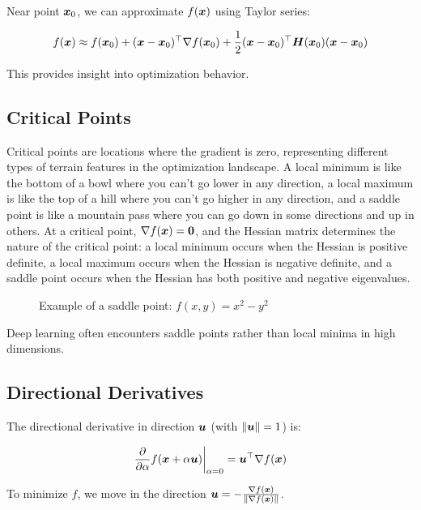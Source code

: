 Near point $\boldsymbol{x}_0$, we can approximate $f(\boldsymbol{x})$ using Taylor series:

\begin{equation}
f(\boldsymbol{x}) \approx f(\boldsymbol{x}_0) + (\boldsymbol{x} - \boldsymbol{x}_0)^\top \nabla f(\boldsymbol{x}_0) + \frac{1}{2}(\boldsymbol{x} - \boldsymbol{x}_0)^\top \boldsymbol{H}(\boldsymbol{x}_0) (\boldsymbol{x} - \boldsymbol{x}_0)
\end{equation}

This provides insight into optimization behavior.

\subsection{Critical Points}

Critical points are locations where the gradient is zero, representing different types of terrain features in the optimization landscape. A local minimum is like the bottom of a bowl where you can't go lower in any direction, a local maximum is like the top of a hill where you can't go higher in any direction, and a saddle point is like a mountain pass where you can go down in some directions and up in others. At a critical point, $\nabla f(\boldsymbol{x}) = \boldsymbol{0}$, and the Hessian matrix determines the nature of the critical point: a local minimum occurs when the Hessian is positive definite, a local maximum occurs when the Hessian is negative definite, and a saddle point occurs when the Hessian has both positive and negative eigenvalues.

\begin{figure}[h]
\centering
{}
\caption{Example of a saddle point: $f(x,y) = x^2 - y^2$}
\label{fig:saddle-point}
\end{figure}

Deep learning often encounters saddle points rather than local minima in high dimensions.

\subsection{Directional Derivatives}

The directional derivative in direction $\boldsymbol{u}$ (with $\|\boldsymbol{u}\| = 1$) is:

\begin{equation}
\frac{\partial}{\partial \alpha} f(\boldsymbol{x} + \alpha \boldsymbol{u}) \bigg|_{\alpha=0} = \boldsymbol{u}^\top \nabla f(\boldsymbol{x})
\end{equation}

To minimize $f$, we move in the direction $\boldsymbol{u} = -\frac{\nabla f(\boldsymbol{x})}{\|\nabla f(\boldsymbol{x})\|}$.
